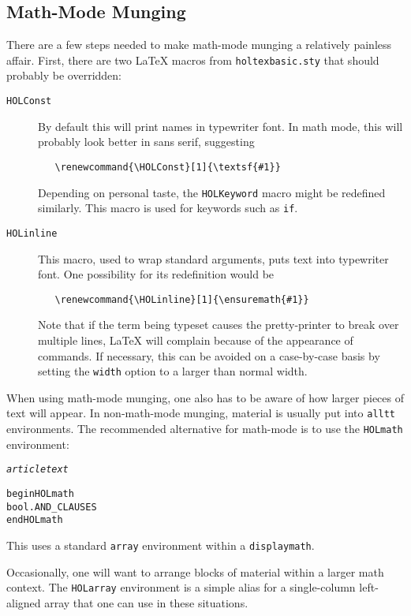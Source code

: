 \subsection{Math-Mode Munging}
\label{sec:math-mode-munging}

There are a few steps needed to make math-mode munging a relatively painless affair.
First, there are two \LaTeX{} macros from \texttt{holtexbasic.sty} that should probably be overridden:
\begin{description}
\item[\texttt{\bs{}HOLConst}] By default this will print names in typewriter font.
In math mode, this will probably look better in sans serif, suggesting
\begin{verbatim}
   \renewcommand{\HOLConst}[1]{\textsf{#1}}
\end{verbatim}
Depending on personal taste, the \texttt{\bs{}HOLKeyword} macro might be redefined similarly.
This macro is used for keywords such as \texttt{if}.
\item[\texttt{\bs{}HOLinline}] This macro, used to wrap standard \texttt{\holtm} arguments, puts text into typewriter font.
One possibility for its redefinition would be
\begin{verbatim}
   \renewcommand{\HOLinline}[1]{\ensuremath{#1}}
\end{verbatim}
Note that if the term being typeset causes the pretty-printer to break over multiple lines, \LaTeX{} will complain because of the appearance of \texttt{\bs\bs} commands.
If necessary, this can be avoided on a case-by-case basis by setting the \texttt{width} option to a larger than normal width.
\end{description}

When using math-mode munging, one also has to be aware of how larger pieces of text will appear.
In non-math-mode munging, material is usually put into \texttt{alltt} environments.
The recommended alternative for math-mode is to use the \texttt{\bs{}HOLmath} environment:
\begin{alltt}
   \textit{article text}

   \bs{}begin\lb{}HOLmath\rb
   \holthm\lb{}bool.AND_CLAUSES\rb
   \bs{}end\lb{}HOLmath\rb
\end{alltt}
This uses a standard \texttt{array} environment within a \texttt{displaymath}.

Occasionally, one will want to arrange blocks of \HOL{} material within a larger math context.
The \texttt{HOLarray} environment is a simple alias for a single-column left-aligned array that one can use in these situations.


